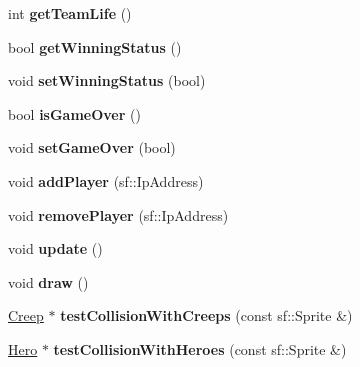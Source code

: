 \begin{DoxyCompactItemize}
\item 
\hypertarget{class_team_a2d90736620aea98f6d821235b2ac72d1}{int {\bfseries get\+Team\+Life} ()}\label{class_team_a2d90736620aea98f6d821235b2ac72d1}

\item 
\hypertarget{class_team_a6ebc1b6601958d931be7d91db62c3715}{bool {\bfseries get\+Winning\+Status} ()}\label{class_team_a6ebc1b6601958d931be7d91db62c3715}

\item 
\hypertarget{class_team_a67b1cb557f373198f7834c6e09200462}{void {\bfseries set\+Winning\+Status} (bool)}\label{class_team_a67b1cb557f373198f7834c6e09200462}

\item 
\hypertarget{class_team_a55cfe10441ae63739fda1fa30652368b}{bool {\bfseries is\+Game\+Over} ()}\label{class_team_a55cfe10441ae63739fda1fa30652368b}

\item 
\hypertarget{class_team_a262df4243b8a6785ec74757963885ec7}{void {\bfseries set\+Game\+Over} (bool)}\label{class_team_a262df4243b8a6785ec74757963885ec7}

\item 
\hypertarget{class_team_ae2a9567e47f7cf6a0174f31efc2e27a0}{void {\bfseries add\+Player} (sf\+::\+Ip\+Address)}\label{class_team_ae2a9567e47f7cf6a0174f31efc2e27a0}

\item 
\hypertarget{class_team_aa04232377322dbf6218164bf34474c20}{void {\bfseries remove\+Player} (sf\+::\+Ip\+Address)}\label{class_team_aa04232377322dbf6218164bf34474c20}

\item 
\hypertarget{class_team_a933317fada8c33ce0b0a71b8ca5bc165}{void {\bfseries update} ()}\label{class_team_a933317fada8c33ce0b0a71b8ca5bc165}

\item 
\hypertarget{class_team_a935e7882329dfe1fae056a005e39799d}{void {\bfseries draw} ()}\label{class_team_a935e7882329dfe1fae056a005e39799d}

\item 
\hypertarget{class_team_a1b760b91b4157b1105835baf9b2bf74d}{\hyperlink{class_creep}{Creep} $\ast$ {\bfseries test\+Collision\+With\+Creeps} (const sf\+::\+Sprite \&)}\label{class_team_a1b760b91b4157b1105835baf9b2bf74d}

\item 
\hypertarget{class_team_a68bbbb70dfebff2407851c442a4e2f7c}{\hyperlink{class_hero}{Hero} $\ast$ {\bfseries test\+Collision\+With\+Heroes} (const sf\+::\+Sprite \&)}\label{class_team_a68bbbb70dfebff2407851c442a4e2f7c}


\end{DoxyCompactItemize}
